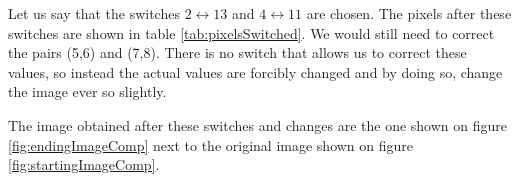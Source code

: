 Let us say that the switches $2\leftrightarrow 13$ and $4\leftrightarrow 11$ are chosen.
The pixels after these switches are shown in table \ref{tab:pixelsSwitched}.
We would still need to correct the pairs (5,6) and (7,8).
There is no switch that allows us to correct these values, so instead the actual values are forcibly changed and by doing so, change the image ever so slightly. 

\begin{table}[h]
\caption{Pixels after switching}
\label{tab:pixelsSwitched}
\centering
{}
\end{table}


The image obtained after these switches and changes are the one shown on figure \ref{fig:endingImageComp} next to the original image shown on figure \ref{fig:startingImageComp}.


